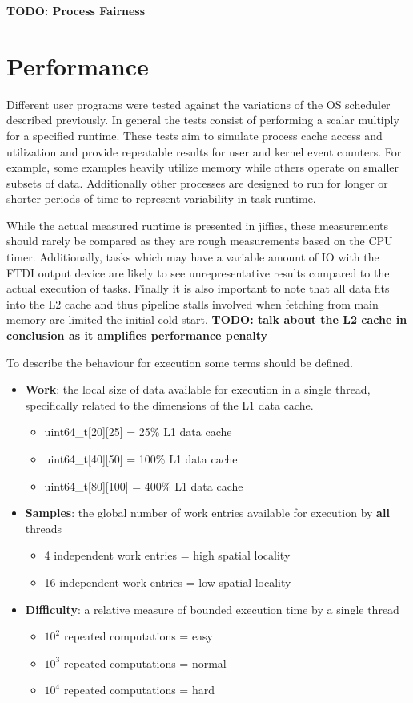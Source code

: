 \documentclass[11pt]{article}
\begin{document}
\textbf{TODO: Process Fairness}


\section{Performance}
\label{sec:performance}
Different user programs were tested against the variations of the OS scheduler described previously.  In general the tests consist of performing a scalar multiply for a specified runtime.  These tests aim to simulate process cache access and utilization and provide repeatable results for user and kernel event counters.  For example, some examples heavily utilize memory while others operate on smaller subsets of data.  Additionally other processes are designed to run for longer or shorter periods of time to represent variability in task runtime.

While the actual measured runtime is presented in jiffies, these measurements should rarely be compared as they are rough measurements based on the CPU timer.  Additionally, tasks which may have a variable amount of IO with the FTDI output device are likely to see unrepresentative results compared to the actual execution of tasks.  Finally it is also important to note that all data fits into the L2 cache and thus pipeline stalls involved when fetching from main memory are limited the initial cold start.  \textbf{TODO: talk about the L2 cache in conclusion as it amplifies performance penalty}

To describe the behaviour for execution some terms should be defined.
\begin{itemize}
	\item \textbf{Work}: the local size of data available for execution in a single thread, specifically related to the dimensions of the L1 data cache.
	\begin{itemize}
		\item uint64\_t[20][25] 	= 25\% L1 data cache
		\item uint64\_t[40][50] 	= 100\% L1 data cache
		\item uint64\_t[80][100] 	= 400\% L1 data cache
	\end{itemize}
	\item \textbf{Samples}: the global number of work entries available for execution by \textbf{all} threads
	\begin{itemize}
		\item 4 independent work entries 	= high spatial locality
		\item 16 independent work entries 	= low spatial locality
	\end{itemize}
	\item \textbf{Difficulty}: a relative measure of bounded execution time by a single thread
	\begin{itemize}
		\item $10^2$ repeated computations = easy
		\item $10^3$ repeated computations = normal
		\item $10^4$ repeated computations = hard
	\end{itemize}
\end{itemize}
\end{document}
